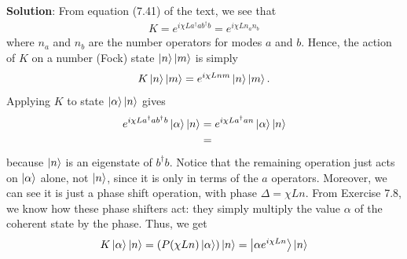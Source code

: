 \documentclass{book}
\begin{document}
    \textbf{Solution}: From equation (7.41) of the text, we see that 
    \begin{align}
        K = e^{i\chi L a^\dagger a b^\dagger b} = e^{i\chi L n_a n_b}
    \end{align}
    where $n_a$ and $n_b$ are the number operators for modes $a$ and $b$. Hence, the action of $K$ on a number (Fock) state $\ket{n}\ket{m}$ is simply
    \begin{align}
        K \ket{n}\ket{m} = e^{i\chi L n m} \ket{n}\ket{m}.
    \end{align}
    Applying $K$ to state $\ket{\alpha}\ket{n}$ gives
    \begin{align}
    \begin{aligned}
        e^{i\chi L a^\dagger a b^\dagger b} \ket{\alpha}\ket{n} &= e^{i\chi L a^\dagger a n} \ket{\alpha}\ket{n} \\
        &= 
    \end{aligned}
    \end{align}
    because $\ket{n}$ is an eigenstate of $b^\dagger b$. Notice that the remaining operation just acts on $\ket{\alpha}$ alone, not $\ket{n}$, since it is only in terms of the $a$ operators. Moreover, we can see it is just a phase shift operation, with phase $\Delta = \chi L n$. From Exercise 7.8, we know how these phase shifters act: they simply multiply the value $\alpha$ of the coherent state by the phase. Thus, we get
    \begin{align}
        K \ket{\alpha}\ket{n} = (P(\chi L n) \ket{\alpha}) \ket{n} = \ket{\alpha e^{i\chi L n}} \ket{n}
    \end{align}
\end{document}
